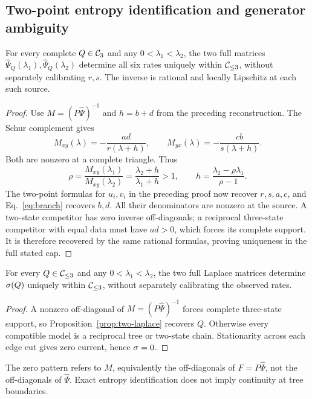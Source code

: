 \subsection{Two-point entropy identification and generator ambiguity}\label{subsec:two-laplace}

\begin{proposition}\label{prop:two-laplace}
For every complete $Q\in\mathcal C_3$ and any $0<\lambda_1<\lambda_2$, the two full
matrices $\widehat\Psi_Q(\lambda_1),\widehat\Psi_Q(\lambda_2)$ determine all
six rates uniquely within $\mathcal C_{\le3}$, without separately calibrating $r,s$.
The inverse is rational and locally Lipschitz at each such source.
\end{proposition}
\begin{proof}
Use $M=(P\widehat\Psi)^{-1}$ and $h=b+d$ from the preceding reconstruction.
The Schur complement gives
\begin{equation}
 M_{xy}(\lambda)=-\frac{ad}{r(\lambda+h)},\qquad
 M_{yx}(\lambda)=-\frac{cb}{s(\lambda+h)}.
 \label{eq:two-offdiagonal}
\end{equation}
Both are nonzero at a complete triangle. Thus
\begin{equation}
 \rho=\frac{M_{xy}(\lambda_1)}{M_{xy}(\lambda_2)}
 =\frac{\lambda_2+h}{\lambda_1+h}>1,
 \qquad h=\frac{\lambda_2-\rho\lambda_1}{\rho-1}.
 \label{eq:two-hidden-escape}
\end{equation}
The two-point formulas for $u_i,v_i$ in the preceding proof now recover
$r,s,a,c$, and Eq.~\eqref{eq:branch} recovers $b,d$. All their denominators
are nonzero at the source. A two-state competitor has zero inverse
off-diagonals; a reciprocal three-state competitor with equal data must
have $ad>0$, which forces its complete support. It is therefore recovered
by the same rational formulas, proving uniqueness in the full stated cap.
\end{proof}

\begin{corollary}\label{cor:two-laplace-entropy}
For every $Q\in\mathcal C_{\le3}$ and any $0<\lambda_1<\lambda_2$, the two full
Laplace matrices determine $\sigma(Q)$ uniquely within $\mathcal C_{\le3}$,
without separately calibrating the observed rates.
\end{corollary}
\begin{proof}
A nonzero off-diagonal of $M=(P\widehat\Psi)^{-1}$ forces complete
three-state support, so Proposition~\ref{prop:two-laplace} recovers $Q$.
Otherwise every compatible model is a reciprocal tree or two-state chain.
Stationarity across each edge cut gives zero current, hence $\sigma=0$.
\end{proof}
The zero pattern refers to $M$, equivalently the off-diagonals of
$F=P\widehat\Psi$, not the off-diagonals of $\widehat\Psi$.
Exact entropy identification does not imply continuity at tree boundaries.

